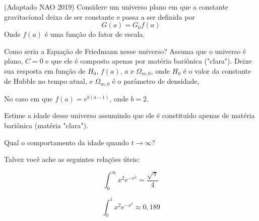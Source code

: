 \documentclass[11pt]{article}
\begin{document}
\begin{pproblem}(Adaptado NAO 2019) 
    Considere um universo plano em que a constante gravitacional deixa de ser constante e passa a ser definida por
    \[G(a) = G_0 f(a)\]
    Onde \(f(a)\) é uma função do fator de escala.
    \begin{alternativas}
        \item Como seria a Equação de Friedmann nesse universo? Assuma que o universo é plano, \(C = 0\) e que ele é composto apenas por matéria bariônica ("clara"). Deixe sua resposta em função de \(H_0\), \(f(a)\), \(a\) e \(\Omega_{m,0}\), onde \(H_0\) é o valor da constante de Hubble no tempo atual, e \(\Omega_{m,0}\) é o parâmetro de densidade,
        
        No caso em que \(f(a) = e^{b(a-1)}\), onde \(b=2\).
        
        \item Estime a idade desse universo assumindo que ele é constituído apenas de matéria bariônica (matéria "clara").
                
        \item Qual o comportamento da idade quando \(t \rightarrow \infty\)?
    \end{alternativas}

    Talvez você ache as seguintes relações úteis:
    \begin{paracol}{2}
        \[\int_0^\infty x^2 e^{-x^2} = \frac{\sqrt{\pi}}{4}\]

        \switchcolumn

        \[\int_0^1 x^2 e^{-x^2} \approx 0,189\]
    \end{paracol}
\end{pproblem}
\end{document}
